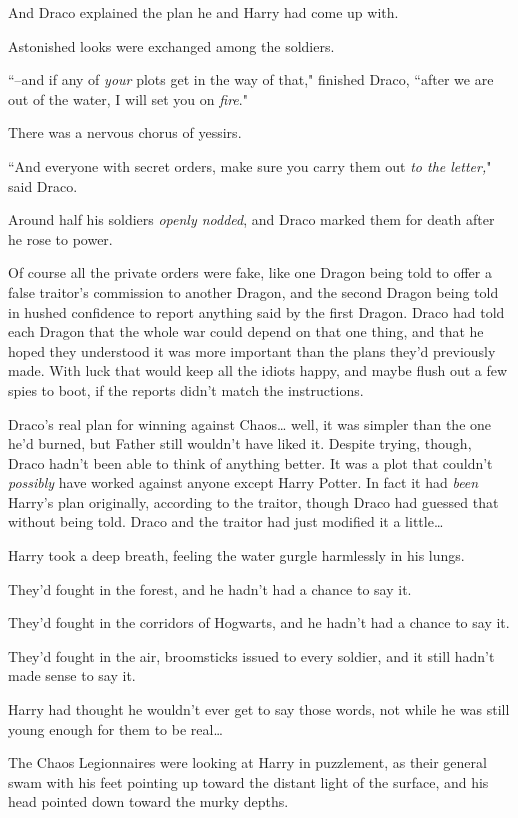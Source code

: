 And Draco explained the plan he and Harry had come up with.

Astonished looks were exchanged among the soldiers.

``\---and if any of \emph{your} plots get in the way of that," finished Draco, ``after we are out of the water, I will set you on \emph{fire}."

There was a nervous chorus of yessirs.

``And everyone with secret orders, make sure you carry them out \emph{to the letter,}" said Draco.

Around half his soldiers \emph{openly nodded}, and Draco marked them for death after he rose to power.

Of course all the private orders were fake, like one Dragon being told to offer a false traitor's commission to another Dragon, and the second Dragon being told in hushed confidence to report anything said by the first Dragon. Draco had told each Dragon that the whole war could depend on that one thing, and that he hoped they understood it was more important than the plans they'd previously made. With luck that would keep all the idiots happy, and maybe flush out a few spies to boot, if the reports didn't match the instructions.

Draco's real plan for winning against Chaos{\ldots} well, it was simpler than the one he'd burned, but Father still wouldn't have liked it. Despite trying, though, Draco hadn't been able to think of anything better. It was a plot that couldn't \emph{possibly} have worked against anyone except Harry Potter. In fact it had \emph{been} Harry's plan originally, according to the traitor, though Draco had guessed that without being told. Draco and the traitor had just modified it a little{\ldots}

\later

Harry took a deep breath, feeling the water gurgle harmlessly in his lungs.

They'd fought in the forest, and he hadn't had a chance to say it.

They'd fought in the corridors of Hogwarts, and he hadn't had a chance to say it.

They'd fought in the air, broomsticks issued to every soldier, and it still hadn't made sense to say it.

Harry had thought he wouldn't ever get to say those words, not while he was still young enough for them to be real{\ldots}

The Chaos Legionnaires were looking at Harry in puzzlement, as their general swam with his feet pointing up toward the distant light of the surface, and his head pointed down toward the murky depths.

